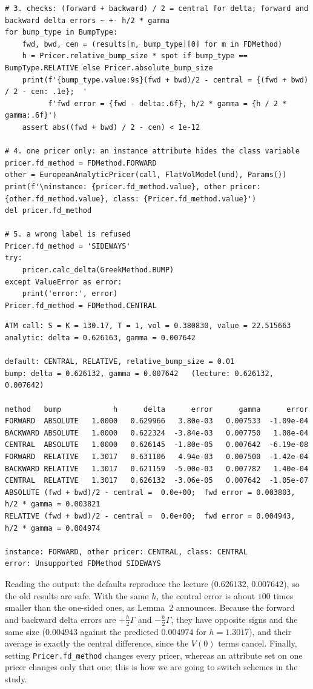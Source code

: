 \documentclass[11pt,a4paper]{article}
\begin{document}
\begin{lstlisting}[style=pysmall]
# 3. checks: (forward + backward) / 2 = central for delta; forward and backward delta errors ~ +- h/2 * gamma
for bump_type in BumpType:
    fwd, bwd, cen = (results[m, bump_type][0] for m in FDMethod)
    h = Pricer.relative_bump_size * spot if bump_type == BumpType.RELATIVE else Pricer.absolute_bump_size
    print(f'{bump_type.value:9s}(fwd + bwd)/2 - central = {(fwd + bwd) / 2 - cen: .1e};  '
          f'fwd error = {fwd - delta:.6f}, h/2 * gamma = {h / 2 * gamma:.6f}')
    assert abs((fwd + bwd) / 2 - cen) < 1e-12

# 4. one pricer only: an instance attribute hides the class variable
pricer.fd_method = FDMethod.FORWARD
other = EuropeanAnalyticPricer(call, FlatVolModel(und), Params())
print(f'\ninstance: {pricer.fd_method.value}, other pricer: {other.fd_method.value}, class: {Pricer.fd_method.value}')
del pricer.fd_method

# 5. a wrong label is refused
Pricer.fd_method = 'SIDEWAYS'
try:
    pricer.calc_delta(GreekMethod.BUMP)
except ValueError as error:
    print('error:', error)
Pricer.fd_method = FDMethod.CENTRAL
\end{lstlisting}
\begin{lstlisting}[style=out]
ATM call: S = K = 130.17, T = 1, vol = 0.380830, value = 22.515663
analytic: delta = 0.626163, gamma = 0.007642

default: CENTRAL, RELATIVE, relative_bump_size = 0.01
bump: delta = 0.626132, gamma = 0.007642   (lecture: 0.626132, 0.007642)

method   bump            h      delta      error      gamma      error
FORWARD  ABSOLUTE   1.0000   0.629966   3.80e-03   0.007533  -1.09e-04
BACKWARD ABSOLUTE   1.0000   0.622324  -3.84e-03   0.007750   1.08e-04
CENTRAL  ABSOLUTE   1.0000   0.626145  -1.80e-05   0.007642  -6.19e-08
FORWARD  RELATIVE   1.3017   0.631106   4.94e-03   0.007500  -1.42e-04
BACKWARD RELATIVE   1.3017   0.621159  -5.00e-03   0.007782   1.40e-04
CENTRAL  RELATIVE   1.3017   0.626132  -3.06e-05   0.007642  -1.05e-07
ABSOLUTE (fwd + bwd)/2 - central =  0.0e+00;  fwd error = 0.003803, h/2 * gamma = 0.003821
RELATIVE (fwd + bwd)/2 - central =  0.0e+00;  fwd error = 0.004943, h/2 * gamma = 0.004974

instance: FORWARD, other pricer: CENTRAL, class: CENTRAL
error: Unsupported FDMethod SIDEWAYS
\end{lstlisting}
\noindent Reading the output: the defaults reproduce the lecture ($0.626132$, $0.007642$), so the old results are safe. With the same $h$, the central error is about $100$ times smaller than the one-sided ones, as Lemma~2 announces. Because the forward and backward delta errors are $+\frac h2\Gamma$ and $-\frac h2\Gamma$, they have opposite signs and the same size ($0.004943$ against the predicted $0.004974$ for $h=1.3017$), and their average is exactly the central difference, since the $V(0)$ terms cancel. Finally, setting \texttt{Pricer.fd\_method} changes every pricer, whereas an attribute set on one pricer changes only that one; this is how we are going to switch schemes in the study.
\end{document}
